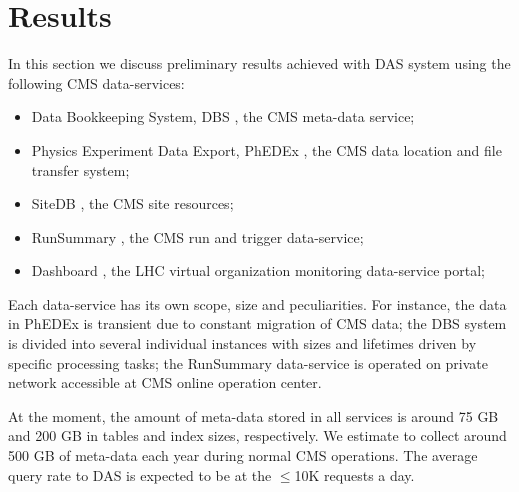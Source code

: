 \documentclass[1p,times]{elsarticle}
\begin{document}
\section{Results\label{Results}}
In this section we discuss preliminary results achieved with DAS system
using the following CMS data-services:
\begin{itemize}
\item Data Bookkeeping System, DBS \cite{DBS}, the CMS meta-data service;
\item Physics Experiment Data Export, PhEDEx \cite {PhEDEx}, the 
CMS data location and file transfer system;
\item SiteDB \cite{SiteDB}, the CMS site resources;
\item RunSummary \cite{RunSummary}, the CMS run and trigger data-service;
\item Dashboard \cite{Dashboard}, the LHC virtual organization
monitoring data-service portal;
\end{itemize}
Each data-service has its own scope, size and peculiarities. 
For instance, the data in PhEDEx is transient due to constant 
migration of CMS data; the DBS system is divided into several individual 
instances with sizes and lifetimes driven by specific processing tasks; 
the RunSummary data-service is operated on private network accessible 
at CMS online operation center.

At the moment, the amount of meta-data stored in all services is around
75 GB and 200 GB in tables and index sizes, respectively. We estimate to
collect around 500 GB of meta-data each year during 
normal CMS operations. The average query rate to DAS is expected to be at the 
$\leq$10K requests a day.
\end{document}
